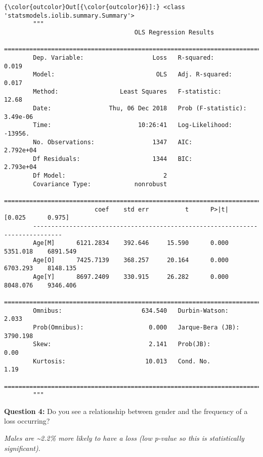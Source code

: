 \documentclass[11pt]{article}
\begin{document}
 \begin{Verbatim}[commandchars=\\\{\}]
{\color{outcolor}Out[{\color{outcolor}6}]:} <class 'statsmodels.iolib.summary.Summary'>
        """
                                    OLS Regression Results
        ==============================================================================
        Dep. Variable:                   Loss   R-squared:                       0.019
        Model:                            OLS   Adj. R-squared:                  0.017
        Method:                 Least Squares   F-statistic:                     12.68
        Date:                Thu, 06 Dec 2018   Prob (F-statistic):           3.49e-06
        Time:                        10:26:41   Log-Likelihood:                -13956.
        No. Observations:                1347   AIC:                         2.792e+04
        Df Residuals:                    1344   BIC:                         2.793e+04
        Df Model:                           2
        Covariance Type:            nonrobust
        ==============================================================================
                         coef    std err          t      P>|t|      [0.025      0.975]
        ------------------------------------------------------------------------------
        Age[M]      6121.2834    392.646     15.590      0.000    5351.018    6891.549
        Age[O]      7425.7139    368.257     20.164      0.000    6703.293    8148.135
        Age[Y]      8697.2409    330.915     26.282      0.000    8048.076    9346.406
        ==============================================================================
        Omnibus:                      634.540   Durbin-Watson:                   2.033
        Prob(Omnibus):                  0.000   Jarque-Bera (JB):             3790.198
        Skew:                           2.141   Prob(JB):                         0.00
        Kurtosis:                      10.013   Cond. No.                         1.19
        ==============================================================================
        """
\end{Verbatim}


\newpage
    \fullline


    \textbf{Question 4:} Do you see a relationship between gender and the
frequency of a loss occurring?

\emph{Males are \textasciitilde{}2.2\% more likely to have a loss (low
p-value so this is statistically significant).}
\end{document}
